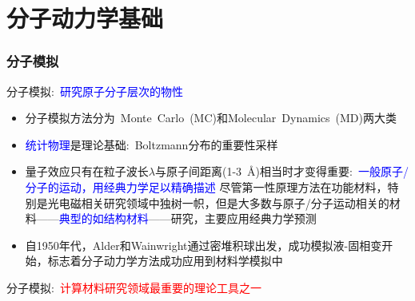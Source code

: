 \section{分子动力学基础}
\frame
{
	\frametitle{分子模拟}
	分子模拟:~\textcolor{blue}{研究原子分子层次的物性}
	\begin{itemize}
		\item 分子模拟方法分为~\textrm{Monte~Carlo~(MC)}和\textrm{Molecular~Dynamics~(MD)}两大类
		\item \textcolor{blue}{统计物理}是理论基础:~\textrm{Boltzmann}分布的重要性采样
	\end{itemize}
	\begin{itemize}
		\item 量子效应只有在粒子波长$\lambda$与原子间距离\textrm{(1-3~\AA)}相当时才变得重要:~\textcolor{blue}{一般原子/分子的运动，用经典力学足以精确描述}
			\vskip 2pt
			尽管第一性原理方法在功能材料，特别是光电磁相关研究领域中独树一帜，但是大多数与原子/分子运动相关的材料——\textcolor{blue}{典型的如结构材料}——研究，主要应用经典力学预测%
		\item 自\textrm{1950}年代，\textrm{Alder}和\textrm{Wainwright}通过密堆积球出发，成功模拟液-固相变开始，标志着分子动力学方法成功应用到材料学模拟中
	\end{itemize}
	分子模拟:~\textcolor{red}{计算材料研究领域最重要的理论工具之一}
}

